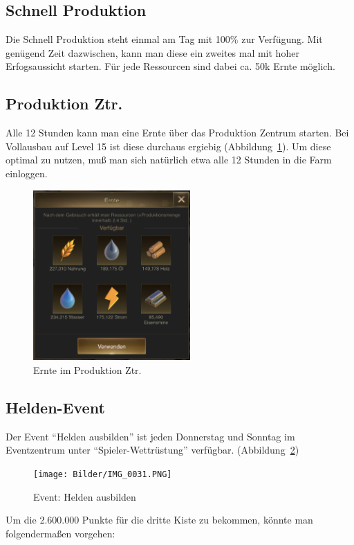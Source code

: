 \documentclass[fontsize=12pt,a4paper]{scrartcl}[2003/01/01]
\begin{document}
\subsection{Schnell Produktion}
Die Schnell Produktion steht einmal am Tag mit 100\% zur Verfügung. Mit genügend Zeit dazwischen, kann man diese ein zweites mal mit hoher Erfogsaussicht starten.
Für jede Ressourcen sind dabei ca. 50k Ernte möglich.


\subsection{Produktion Ztr.}
Alle 12 Stunden kann man eine Ernte über das Produktion Zentrum starten. Bei Vollausbau auf Level 15 ist diese durchaus ergiebig (Abbildung~\ref{fig:ernte}).
Um diese optimal zu nutzen, muß man sich natürlich etwa alle 12 Stunden in die Farm einloggen.
\begin{figure}[H] 
  \centering
     \includegraphics[width=6cm]{Bilder/IMG_E0014.JPG}
  \caption{Ernte im Produktion Ztr.}
  \label{fig:ernte}
\end{figure}


\subsection{Helden-Event}
\label{Heldenevent}
Der Event "`Helden ausbilden"' ist jeden Donnerstag und Sonntag im Eventzentrum unter "`Spieler-Wettrüstung"' verfügbar. (Abbildung~\ref{fig:helden})

\begin{figure}[H] 
  \centering
     \texttt{[image: Bilder/IMG\_0031.PNG]}
  \caption{Event: Helden ausbilden}
  \label{fig:helden}
\end{figure}

Um die 2.600.000 Punkte für die dritte Kiste zu bekommen, könnte man folgendermaßen vorgehen:
\end{document}
